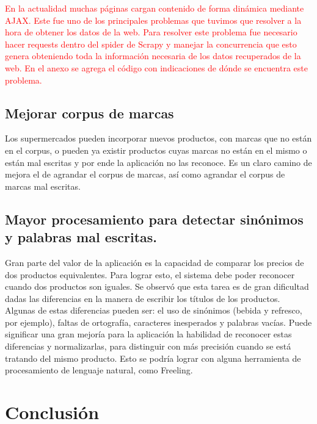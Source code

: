 \documentclass[12pt]{article} %
\begin{document}
\textcolor{red}{En la actualidad muchas páginas cargan contenido de forma dinámica mediante AJAX. Este fue uno de los principales problemas que tuvimos que resolver a la hora de obtener los datos de la web. Para resolver este problema fue necesario hacer requests dentro del spider de Scrapy y manejar la concurrencia que esto genera obteniendo toda la información necesaria de los datos recuperados de la web. En el anexo se agrega el código con indicaciones de dónde se encuentra este problema.}


\subsection{Mejorar corpus de marcas}
Los supermercados pueden incorporar nuevos productos, con marcas que no están en el corpus, o pueden ya existir productos cuyas marcas no están en el mismo o están mal escritas y por ende la aplicación no las reconoce. Es un claro camino de mejora el de agrandar el corpus de marcas, así como agrandar el corpus de marcas mal escritas.


\subsection{Mayor procesamiento para detectar sinónimos y palabras mal escritas.}
Gran parte del valor de la aplicación es la capacidad de comparar los precios de dos productos equivalentes. Para lograr esto, el sistema debe poder reconocer cuando dos productos son iguales. Se observó que esta tarea es de gran dificultad dadas las diferencias en la manera de escribir los títulos de los productos. Algunas de estas diferencias pueden ser: el uso de sinónimos (bebida y refresco, por ejemplo), faltas de ortografía, caracteres inesperados y palabras vacías. Puede significar una gran mejoría para la aplicación la habilidad de reconocer estas diferencias y normalizarlas, para distinguir con más precisión cuando se está tratando del mismo producto. Esto se podría lograr con alguna herramienta de procesamiento de lenguaje natural, como Freeling.



\section{Conclusión}
\end{document}
